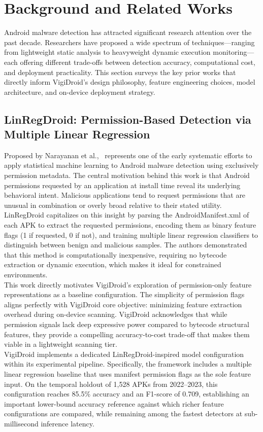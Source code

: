 \chapter{Background and Related Works}\label{ch:citations}

Android malware detection has attracted significant research attention over the past decade. Researchers have proposed a wide spectrum of techniques—ranging from lightweight static analysis to heavyweight dynamic execution monitoring—each offering different trade-offs between detection accuracy, computational cost, and deployment practicality. This section surveys the key prior works that directly inform VigiDroid's design philosophy, feature engineering choices, model architecture, and on-device deployment strategy.


\section{LinRegDroid: Permission-Based Detection via Multiple Linear Regression}
\label{sec:cite}
Proposed by Narayanan et al.,~\cite{linregdroid} represents one of the early systematic efforts to apply statistical machine learning to Android malware detection using exclusively permission metadata. The central motivation behind this work is that Android permissions requested by an application at install time reveal its underlying behavioral intent. Malicious applications tend to request permissions that are unusual in combination or overly broad relative to their stated utility. LinRegDroid capitalizes on this insight by parsing the AndroidManifest.xml of each APK to extract the requested permissions, encoding them as binary feature flags (1 if requested, 0 if not), and training multiple linear regression classifiers to distinguish between benign and malicious samples. The authors demonstrated that this method is computationally inexpensive, requiring no bytecode extraction or dynamic execution, which makes it ideal for constrained environments.\\

This work directly motivates VigiDroid's exploration of permission-only feature representations as a baseline configuration. The simplicity of permission flags aligns perfectly with VigiDroid core objective: minimizing feature extraction overhead during on-device scanning. VigiDroid acknowledges that while permission signals lack deep expressive power compared to bytecode structural features, they provide a compelling accuracy-to-cost trade-off that makes them viable in a lightweight scanning tier.\\
VigiDroid implements a dedicated LinRegDroid-inspired model configuration within its experimental pipeline. Specifically, the framework includes a multiple linear regression baseline that uses manifest permission flags as the sole feature input. On the temporal holdout of 1,528 APKs from 2022--2023, this configuration reaches 85.5\% accuracy and an F1-score of 0.709, establishing an important lower-bound accuracy reference against which richer feature configurations are compared, while remaining among the fastest detectors at sub-millisecond inference latency.\\

